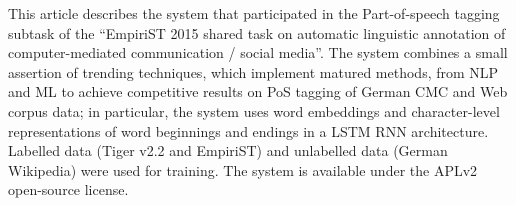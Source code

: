 This article describes the system that participated in the Part-of-speech tagging subtask of the ``EmpiriST 2015 shared task on automatic linguistic annotation of computer-mediated communication / social media''. The system combines a small assertion of trending techniques, which implement matured methods, from NLP and ML to achieve competitive results on PoS tagging of German CMC and Web corpus data; in particular, the system uses word embeddings and character-level representations of word beginnings and endings in a LSTM RNN architecture.  Labelled data (Tiger v2.2 and EmpiriST) and unlabelled data (German Wikipedia) were used for training. The system is available under the APLv2 open-source license.
